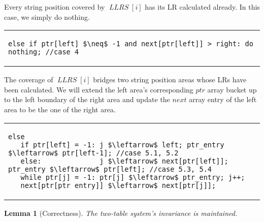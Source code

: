 \documentclass[preprint]{elsarticle}
\newtheorem{lemma}{Lemma}[section]
\DeclareMathOperator{\llrs}{\mathit{LLRS}}
\begin{document}
\smallskip



 Every string position covered by $\llrs[i]$ has
its LR calculated already. In this case, we simply do nothing. 

\smallskip 

\begin{tabular}{l}
{\footnotesize
\begin{lstlisting}
else if ptr[left] $\neq$ -1 and next[ptr[left]] > right: do nothing; //case 4
\end{lstlisting}
}
\end{tabular}

\smallskip

 The coverage of $\llrs[i]$ bridges two 
string position areas whose LRs have been calculated. 
We will extend the left area's corresponding $ptr$ array bucket up to
the left boundary of the
right area and update the $next$ array entry of the left area to be the
one of the right area. 

\smallskip

\begin{tabular}{l} 
{\footnotesize
\begin{lstlisting}
else
   if ptr[left] = -1: j $\leftarrow$ left; ptr_entry $\leftarrow$ ptr[left-1]; //case 5.1, 5.2
   else:              j $\leftarrow$ next[ptr[left]]; ptr_entry $\leftarrow$ ptr[left]; //case 5.3, 5.4
   while ptr[j] = -1: ptr[j] $\leftarrow$ ptr_entry; j++;
   next[ptr[ptr_entry]] $\leftarrow$ next[ptr[j]];
\end{lstlisting}
}
\end{tabular}





\smallskip

\begin{lemma}[Correctness]
\label{lem:table-correct}
The two-table system's invariance is maintained.
\end{lemma}
\end{document}
